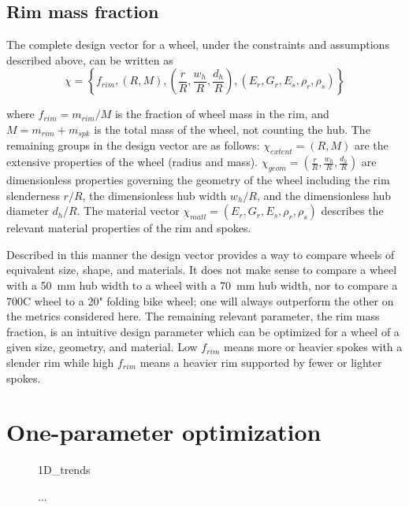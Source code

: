 \documentclass[\rootdir/thesis.tex]{subfiles}
\begin{document}
\subsection{Rim mass fraction}

The complete design vector for a wheel, under the constraints and assumptions described above, can be written as
\begin{equation}
\chi = \left\lbrace f_{rim}, (R, M), \left(\frac{r}{R}, \frac{w_h}{R}, \frac{d_h}{R}\right), (E_r, G_r, E_s, \rho_r, \rho_s) \right\rbrace
\end{equation}

where $f_{rim} = m_{rim}/M$ is the fraction of wheel mass in the rim, and $M=m_{rim} + m_{spk}$ is the total mass of the wheel, not counting the hub. The remaining groups in the design vector are as follows: $\chi_{extent}=(R, M)$ are the extensive properties of the wheel (radius and mass). $\chi_{geom} = \left(\frac{r}{R}, \frac{w_h}{R}, \frac{d_h}{R}\right)$ are dimensionless properties governing the geometry of the wheel including the rim slenderness $r/R$, the dimensionless hub width $w_h/R$, and the dimensionless hub diameter $d_h/R$. The material vector $\chi_{matl}= (E_r, G_r, E_s, \rho_r, \rho_s)$ describes the relevant material properties of the rim and spokes.

Described in this manner the design vector provides a way to compare wheels of equivalent size, shape, and materials. It does not make sense to compare a wheel with a \SI{50}{mm} hub width to a wheel with a \SI{70}{mm} hub width, nor to compare a 700C wheel to a 20" folding bike wheel; one will always outperform the other on the metrics considered here. The remaining relevant parameter, the rim mass fraction, is an intuitive design parameter which can be optimized for a wheel of a given size, geometry, and material. Low $f_{rim}$ means more or heavier spokes with a slender rim while high $f_{rim}$ means a heavier rim supported by fewer or lighter spokes.

\section{One-parameter optimization}

\begin{figure}
\centering
{1D_trends}
\caption{...}
\label{fig:opt_1D_trends}
\end{figure}

\inprogress
\end{document}
